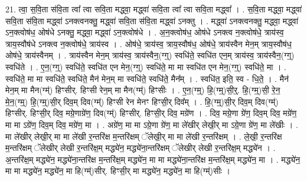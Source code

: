 \documentclass[17pt]{extarticle}
\begin{document}
21. त्वा॒ स॒वि॒ता स॑वि॒ता त्वा᳚ त्वा सवि॒ता मद्ध्वा॒ मद्ध्वा॑ सवि॒ता त्वा᳚ त्वा सवि॒ता मद्ध्वा᳚ । . स॒वि॒ता मद्ध्वा॒ मद्ध्वा॑ सवि॒ता स॑वि॒ता मद्ध्वा॑ ऽनक्त्वनक्तु॒ मद्ध्वा॑ सवि॒ता स॑वि॒ता मद्ध्वा॑ ऽनक्तु । . मद्ध्वा॑ ऽनक्त्वनक्तु॒ मद्ध्वा॒ मद्ध्वा॑ ऽन॒क्त्वोष॑ध॒ ओष॑धे ऽनक्तु॒ मद्ध्वा॒ मद्ध्वा॑ ऽन॒क्त्वोष॑धे । . अ॒न॒क्त्वोष॑ध॒ ओष॑धे ऽनक्त्व न॒क्त्वोष॑धे॒ त्राय॑स्व॒ त्राय॒स्वौष॑धे ऽनक्त्व न॒क्त्वोष॑धे॒ त्राय॑स्व । . ओष॑धे॒ त्राय॑स्व॒ त्राय॒स्वौष॑ध॒ ओष॑धे॒ त्राय॑स्वैन मेन॒म् त्राय॒स्वौष॑ध॒ ओष॑धे॒ त्राय॑स्वैनम् । . त्राय॑स्वैन मेन॒म् त्राय॑स्व॒ त्राय॑स्वैन॒(ग्ग्॒) स्वधि॑ते॒ स्वधि॑त एन॒म् त्राय॑स्व॒ त्राय॑स्वैन॒(ग्ग्॒) स्वधि॑ते । . ए॒न॒(ग्ग्॒) स्वधि॑ते॒ स्वधि॑त एन मेन॒(ग्ग्॒) स्वधि॑ते॒ मा मा स्वधि॑त एन मेन॒(ग्ग्॒) स्वधि॑ते॒ मा । . स्वधि॑ते॒ मा मा स्वधि॑ते॒ स्वधि॑ते॒ मैन॑ मेन॒म् मा स्वधि॑ते॒ स्वधि॑ते॒ मैन᳚म् । . स्वधि॑त॒ इति॒ स्व - धि॒ते॒ । . मैन॑ मेन॒म् मा मैन(ग्म्॑) हिꣳसीर्. हिꣳसी रेन॒म् मा मैन(ग्म्॑) हिꣳसीः । . ए॒न॒(ग्म्॒) हि॒(ग्म्॒)सी॒र्॒. हि॒(ग्म्॒)सी॒ रे॒न॒ मे॒न॒(ग्म्॒) हि॒(ग्म्॒)सी॒र् दिव॒म् दिव(ग्म्॑) हिꣳसी रेन मेनꣳ हिꣳसी॒र् दिव᳚म् । . हि॒(ग्म्॒)सी॒र् दिव॒म् दिव(ग्म्॑) हिꣳसीर्. हिꣳसी॒र् दिव॒ मग्रे॒णाग्रे॑ण॒ दिव(ग्म्॑) हिꣳसीर्. हिꣳसी॒र् दिव॒ मग्रे॑ण । . दिव॒ मग्रे॒णा ग्रे॑ण॒ दिव॒म् दिव॒ मग्रे॑ण॒ मा मा ऽग्रे॑ण॒ दिव॒म् दिव॒ मग्रे॑ण॒ मा । . अग्रे॑ण॒ मा मा ऽग्रे॒णा ग्रे॑ण॒ मा ले॑खीर् लेखी॒र् मा ऽग्रे॒णा ग्रे॑ण॒ मा ले॑खीः । . मा ले॑खीर् लेखी॒र् मा मा ले॑खी र॒न्तरि॑क्ष म॒न्तरि॑क्षम् ॅलेखी॒र् मा मा ले॑खी र॒न्तरि॑क्षम् । . ले॒खी॒ र॒न्तरि॑क्ष म॒न्तरि॑क्षम् ॅलेखीर् लेखी र॒न्तरि॑क्ष॒म् मद्ध्ये॑न॒ मद्ध्ये॑ना॒न्तरि॑क्षम् ॅलेखीर् लेखी र॒न्तरि॑क्ष॒म् मद्ध्ये॑न । . अ॒न्तरि॑क्ष॒म् मद्ध्ये॑न॒ मद्ध्ये॑ना॒न्तरि॑क्ष म॒न्तरि॑क्ष॒म् मद्ध्ये॑न॒ मा मा मद्ध्ये॑ना॒न्तरि॑क्ष म॒न्तरि॑क्ष॒म् मद्ध्ये॑न॒ मा । . मद्ध्ये॑न॒ मा मा मद्ध्ये॑न॒ मद्ध्ये॑न॒ मा हि(ग्म्॑)सीर्. हिꣳसी॒र् मा मद्ध्ये॑न॒ मद्ध्ये॑न॒ मा हि(ग्म्॑)सीः । \newline
\end{document}
